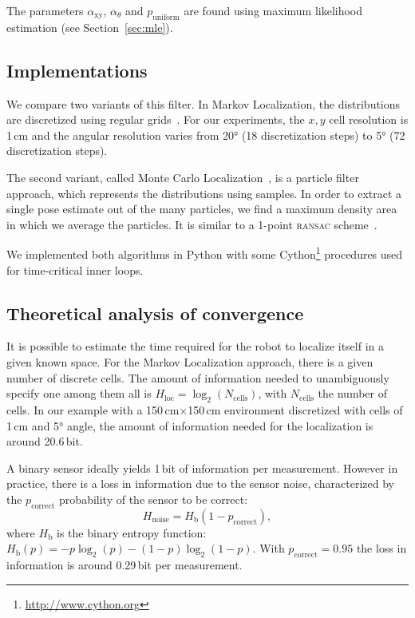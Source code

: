 \documentclass[letterpaper, 10pt, conference]{ieeeconf}
\newcommand{\sect}[1]{Section~\ref{sec:#1}}
\begin{document}
The parameters $\alpha_\mathrm{xy}$, $\alpha_\theta$ and $p_\mathrm{uniform}$ are found using maximum likelihood estimation (see \sect{mle}).

\subsection{Implementations}

We compare two variants of this filter.
In Markov Localization, the distributions are discretized using regular grids~\cite{fox1999markov}.
For our experiments, the $x,y$ cell resolution is 1\,cm and the angular resolution varies from 20° (18 discretization steps) to 5° (72 discretization steps).

The second variant, called Monte Carlo Localization~\cite{dellaert1999monte}, is a particle filter approach, which represents the distributions using samples.
In order to extract a single pose estimate out of the many particles, we find a maximum density area in which we average the particles.
It is similar to a 1-point \textsc{ransac} scheme~\cite{Fischler1981ransac}.

We implemented both algorithms in Python with some Cython\footnote{\url{http://www.cython.org}} procedures used for time-critical inner loops.

\subsection{Theoretical analysis of convergence}
\label{sec:theoreticalconv}

It is possible to estimate the time required for the robot to localize itself in a given known space.
For the Markov Localization approach, there is a given number of discrete cells.
The amount of information needed to unambiguously specify one among them all is $H_\mathrm{loc} = \log_2(N_\mathrm{cells})$, with $N_\mathrm{cells}$ the number of cells.
In our example with a 150\,cm$\times$150\,cm environment discretized with cells of 1\,cm and 5° angle, the amount of information needed for the localization is around 20.6\,bit.

A binary sensor ideally yields 1\,bit of information per measurement.
However in practice, there is a loss in information due to the sensor noise, characterized by the $p_\mathrm{correct}$ probability of the sensor to be correct:
\begin{displaymath}
	H_\mathrm{noise} = H_{\text{b}}(1 - p_\mathrm{correct}),
\end{displaymath}
where $H_{\text{b}}$ is the binary entropy function: $H_{\text{b}}(p) = -p\log_2(p) - (1-p)\log_2(1-p)$.
With $p_\mathrm{correct}=0.95$ the loss in information is around 0.29\,bit per measurement.
\end{document}
